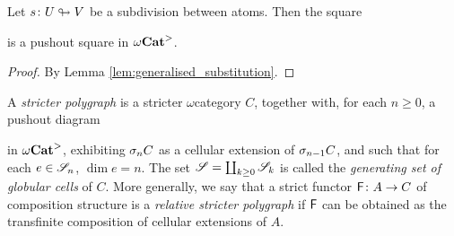 \begin{cor} \label{cor:pushout_principal_cell}
    Let \( s \colon U \looparrowright V \) be a subdivision between atoms.
    Then the square
    \begin{center}
    \end{center}
    is a pushout square in \( {\omega\mathbf{Cat}}^> \).
\end{cor}
\begin{proof}
    By Lemma \ref{lem:generalised_substitution}.
\end{proof}

\begin{dfn}  \label{dfn:stricter_polygraph}
    A \emph{stricter polygraph} is a stricter \( \omega \)\nbd category \( C \), together with, for each \( n \geq 0 \), a pushout diagram
    \begin{center}
    \end{center}
    in \( {\omega\mathbf{Cat}}^> \), exhibiting \( \sigma_{n}C \) as a cellular extension of \( \sigma_{n - 1}C \), and such that for each \( e \in \mathscr{S}_n \), \( \dim e = n \).
    The set \( \mathscr{S} = \coprod_{k \geq 0} \mathscr{S}_k \) is called the \emph{generating set of globular cells} of \( C \).
    More generally, we say that a strict functor \( \mathsf{F} \colon A \to C \) of composition structure is a \emph{relative stricter polygraph} if \( \mathsf{F} \) can be obtained as the transfinite composition of cellular extensions of \( A \).
\end{dfn}

